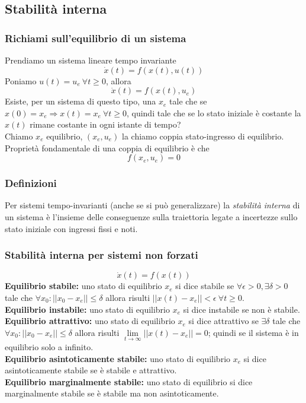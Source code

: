 \documentclass{article}
\begin{document}
\subsection{Stabilità interna}
\subsubsection{Richiami sull'equilibrio di un sistema}
Prendiamo un sistema lineare tempo invariante 
\[
    \dot x(t) = f(x(t), u(t))
\]
Poniamo $u(t) = u_e \ \forall t \geq 0$, allora
\[
    \dot x(t) = f(x(t), u_e) \tag*{$x(0)=x_0$}
\]
Esiste, per un sistema di questo tipo, una $x_e$ tale che se $x(0)=x_e \Longrightarrow x(t) = x_e \ \forall t \geq 0$, quindi tale che se lo stato iniziale è costante la $x(t)$ rimane costante in ogni istante di tempo?
\vspace*{0,2cm}\\
Chiamo $x_e$ equilibrio, $(x_e,u_e)$ la chiamo coppia stato-ingresso di equilibrio.
\vspace*{0.2cm}\\
Proprietà fondamentale di una coppia di equilibrio è che
\[
    f(x_e,u_e) = 0
\]


\subsubsection{Definizioni}
Per sistemi tempo-invarianti (anche se si può generalizzare) la \textit{stabilità interna} di un sistema è l'insieme delle conseguenze sulla traiettoria legate a incertezze sullo stato iniziale con ingressi fissi e noti.


\subsubsection{Stabilità interna per sistemi non forzati}
\[
    \dot x(t) = f(x(t)) \tag*{$x_e$ equilibrio}  
\]
\textbf{Equilibrio stabile:} uno stato di equilibrio $x_e$ si dice stabile se $\forall \epsilon >0, \exists \delta >0$ tale che $\forall x_0 : || x_0-x_e || \leq \delta$ allora risulti $ || x(t) - x_e || < \epsilon \ \forall t \geq 0$. 
\vspace*{0.2cm}\\
\textbf{Equilibrio instabile:} uno stato di equilibrio $x_e$ si dice instabile se non è stabile.
\vspace*{0.2cm}\\
\textbf{Equilibrio attrattivo:} uno stato di equilibrio $x_e$ si dice  attrattivo se $\exists \delta$ tale che $\forall x_0: || x_0-x_e || \leq \delta$ allora risulti $\lim\limits_{t \rightarrow \infty} || x(t)-x_e ||=0$; quindi se il sistema è in equilibrio solo a infinito.
\vspace*{0.2cm}\\
\textbf{Equilibrio asintoticamente stabile:} uno stato di equilibrio $x_e$ si dice asintoticamente stabile se è stabile e attrattivo.
\vspace*{0.2cm}\\
\textbf{Equilibrio marginalmente stabile:} uno stato di equilibrio si dice marginalmente stabile se è stabile ma non asintoticamente.
\end{document}
